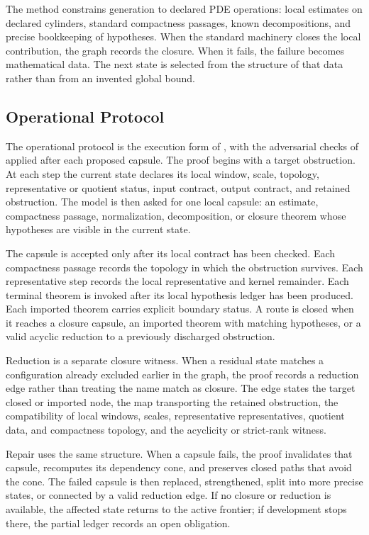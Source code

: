 \documentclass[11pt]{article}
\theoremstyle{plain}
\theoremstyle{definition}
\theoremstyle{remark}
\begin{document}
The method constrains generation to declared PDE operations: local estimates on
declared cylinders, standard compactness passages, known decompositions, and
precise bookkeeping of hypotheses.  When the standard machinery closes the
local contribution, the graph records the closure.  When it fails, the failure
becomes mathematical data.  The next state is selected from the structure of
that data rather than from an invented global bound.

\subsection{Operational Protocol}
\label{sec:protocol}

The operational protocol is the execution form of
, with the adversarial checks of
 applied after each proposed capsule.  The proof
begins with a target obstruction.  At each step the current state declares its
local window, scale, topology, representative or quotient status,
input contract, output contract, and retained obstruction.  The model is then
asked for one local capsule: an estimate, compactness passage, normalization,
decomposition, or closure theorem whose hypotheses are visible in the current
state.

The capsule is accepted only after its local contract has been checked.  Each
compactness passage records the topology in which the obstruction survives.
Each representative step records the local representative and kernel remainder.
Each terminal theorem is invoked after its local hypothesis ledger has been
produced.  Each imported theorem carries explicit boundary status.  A route is
closed when it reaches a closure capsule, an imported theorem with matching
hypotheses, or a valid acyclic reduction to a previously discharged
obstruction.

Reduction is a separate closure witness.  When a residual state matches a
configuration already excluded earlier in the graph, the proof records a
reduction edge rather than treating the name match as closure.  The edge states
the target closed or imported node, the map transporting the retained
obstruction, the compatibility of local windows, scales, representative
representatives, quotient data, and compactness topology, and the acyclicity or
strict-rank witness.

Repair uses the same structure.  When a capsule fails, the proof invalidates
that capsule, recomputes its dependency cone, and preserves closed paths that
avoid the cone.  The failed capsule is then replaced, strengthened, split into
more precise states, or connected by a valid reduction edge.  If no closure or
reduction is available, the affected state returns to the active frontier; if
development stops there, the partial ledger records an open obligation.
\end{document}

